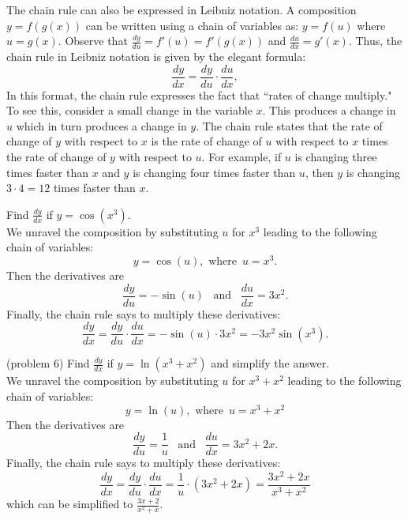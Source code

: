 \documentclass[handout]{ximera}
\begin{document}
The chain rule can also be expressed in Leibniz notation.  A composition $y = f(g(x))$ can be written using a chain of variables 
as: $y = f(u)$ where $u = g(x)$. Observe that $\frac{dy}{du} = f'(u) = f'(g(x))$ and $\frac{du}{dx} = g'(x)$. 
Thus, the chain rule in Leibniz notation is given by the elegant formula:
\[
\frac{dy}{dx} = \frac{dy}{du} \cdot \frac{du}{dx},
\]
In this format, the chain rule expresses the fact that ``rates of change multiply."  
To see this, consider a small change in the variable $x$.  This produces a change in $u$ which in turn produces a change in $y$.
The chain rule states that the rate of change of $y$  with respect to $x$ is the rate of change of $u$ with 
respect to $x$ times the rate of change of $y$ with respect to $u$.
For example, if $u$ is changing three times faster than $x$ and $y$ is changing four times faster than $u$, then $y$ is changing $3 \cdot 4 = 12$ times faster than $x$.
\begin{center}
\end{center}

\begin{example}[example 6]
Find $\frac{dy}{dx}$ if $y = \cos(x^3)$.\\
 We unravel the composition by substituting $u$ for $x^3$ leading to the following chain of variables: 
\[
y = \cos(u),  \text{ where } \, u = x^3.
\]
Then the derivatives are
\[
\frac{dy}{du} = -\sin(u)  \,\,\,\text{  and  }  \,\,\,\frac{du}{dx} = 3x^2.
\]
Finally, the chain rule says to multiply these derivatives:
\[
\frac{dy}{dx} = \frac{dy}{du} \cdot \frac{du}{dx} = -\sin(u) \cdot 3x^2 = -3x^2\sin(x^3).
\]
\end{example}

\begin{problem}(problem 6)
Find $\frac{dy}{dx}$ if $y = \ln(x^3 +x^2)$ and simplify the answer.\\
  We unravel the composition by substituting $u$ for $x^3 + x^2$ leading to the following chain of variables:
\[
y = \ln(u),  \text{ where } \, u = x^3 + x^2
\]
Then the derivatives are
\[
\frac{dy}{du} = \frac{1}{u}  \,\,\,\text{  and  }  \,\,\,\frac{du}{dx} = 3x^2 + 2x.
\]
Finally, the chain rule says to multiply these derivatives:
\[
\frac{dy}{dx} = \frac{dy}{du} \cdot \frac{du}{dx} = \frac{1}{u} \cdot (3x^2 + 2x) = \frac{3x^2 + 2x}{x^3 + x^2}
\]
which can be simplified to $\frac{3x + 2}{x^2 + x}$.
\end{problem}
\end{document}
